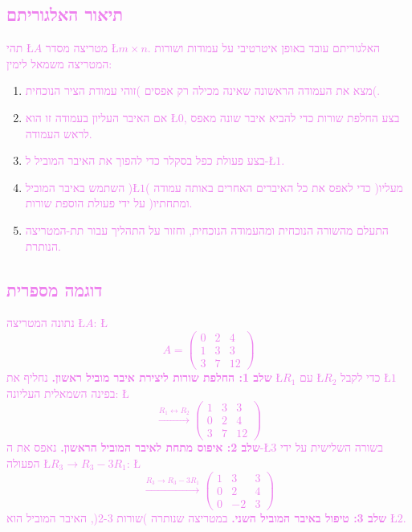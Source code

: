 \documentclass[english,hebrew]{article}
\begin{document}
\subsection*{\textcolor{violet}{תיאור האלגוריתם}}

\textcolor{violet}{תהי \L{$A$} מטריצה מסדר \L{$m\times n$}. האלגוריתם
עובד באופן איטרטיבי על עמודות ושורות המטריצה משמאל לימין: }
\begin{enumerate}
\item \textcolor{violet}{מצא את העמודה הראשונה שאינה מכילה רק אפסים )זוהי
עמודת הציר הנוכחית(. }
\item \textcolor{violet}{אם האיבר העליון בעמודה זו הוא \L{$0$}, בצע החלפת
שורות כדי להביא איבר שונה מאפס לראש העמודה. }
\item \textcolor{violet}{בצע פעולת כפל בסקלר כדי להפוך את האיבר המוביל ל-\L{$1$}. }
\item \textcolor{violet}{השתמש באיבר המוביל )\L{$1$}( כדי לאפס את כל האיברים
האחרים באותה עמודה )מעליו ומתחתיו( על ידי פעולת הוספת שורות. }
\item \textcolor{violet}{התעלם מהשורה הנוכחית ומהעמודה הנוכחית, וחזור על
התהליך עבור תת-המטריצה הנותרת. }
\end{enumerate}

\subsection*{\textcolor{violet}{דוגמה מספרית}}

\textcolor{violet}{נתונה המטריצה \L{$A$}: \L{%
\[
A=\begin{pmatrix}0 & 2 & 4\\
1 & 3 & 3\\
3 & 7 & 12
\end{pmatrix}
\]
}%
}\textbf{\textcolor{violet}{שלב 1: החלפת שורות ליצירת איבר מוביל ראשון.}}\textcolor{violet}{{}
נחליף את \L{$R_{1}$} עם \L{$R_{2}$} כדי לקבל \L{$1$} בפינה השמאלית
העליונה: \L{%
\[
\xrightarrow{R_{1}\leftrightarrow R_{2}}\begin{pmatrix}1 & 3 & 3\\
0 & 2 & 4\\
3 & 7 & 12
\end{pmatrix}
\]
}%
}\textbf{\textcolor{violet}{שלב 2: איפוס מתחת לאיבר המוביל הראשון.}}\textcolor{violet}{{}
נאפס את ה-\L{$3$} בשורה השלישית על ידי הפעולה \L{$R_{3}\to R_{3}-3R_{1}$}:
\L{%
\[
\xrightarrow{R_{3}\to R_{3}-3R_{1}}\begin{pmatrix}1 & 3 & 3\\
0 & 2 & 4\\
0 & -2 & 3
\end{pmatrix}
\]
}%
}\textbf{\textcolor{violet}{שלב 3: טיפול באיבר המוביל השני.}}\textcolor{violet}{{}
במטריצה שנותרה )שורות 2-3(, האיבר המוביל הוא \L{$2$}.}
\end{document}
